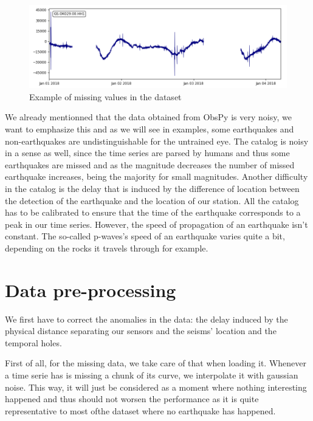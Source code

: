 \documentclass[10pt,conference,compsocconf]{IEEEtran}
\begin{document}
\begin{figure}[h]
  \centering
	\includegraphics[width=\columnwidth]{hole_example.png}
  \caption{Example of missing values in the dataset}
	\label{fig:10min-example}
\end{figure}

We already mentionned that the data obtained from ObsPy is very noisy, we want to emphasize this and as we will see in examples, some earthquakes and non-earthquakes are undistinguishable for the untrained eye. The catalog is noisy in a sense as well, since the time series are parsed by humans and thus some earthquakes are missed and as the magnitude decreases the number of missed earthquake increases, being the majority for small magnitudes. Another difficulty in the catalog is the delay that is induced by the difference of location between the detection of the earthquake and the location of our station. All the catalog has to be calibrated to ensure that the time of the earthquake corresponds to a peak in our time series. However, the speed of propagation of an earthquake isn't constant. The so-called p-waves's speed of an earthquake varies quite a bit, depending on the rocks it travels through for example.

\section{Data pre-processing}
We first have to correct the anomalies in the data: the delay induced by the physical distance separating our sensors and the seisms' location and the temporal holes.\newline

First of all, for the missing data, we take care of that when loading it. Whenever a time serie has is missing a chunk of its curve, we interpolate it with gaussian noise. This way, it will just be considered as a moment where nothing interesting happened and thus should not worsen the performance as it is quite representative to most ofthe dataset where no earthquake has happened.
\end{document}
